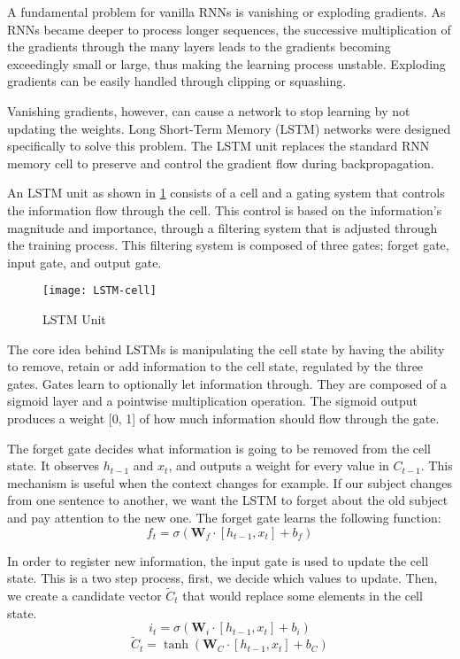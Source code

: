 A fundamental problem for vanilla RNNs is vanishing or exploding gradients. As RNNs became deeper to process longer sequences, the successive multiplication of the gradients through the many layers leads to the gradients becoming exceedingly small or large, thus making the learning process unstable. Exploding gradients can be easily handled through clipping or squashing.

Vanishing gradients, however, can cause a network to stop learning by not updating the weights. Long Short-Term Memory (LSTM) networks \citep{hochreiter1997long} were designed specifically to solve this problem. The LSTM unit replaces the standard RNN memory cell to preserve and control the gradient flow during backpropagation.

An LSTM unit as shown in \cref{fig:lstm_cell} consists of a cell and a gating system that controls the information flow through the cell. This control is based on the information's magnitude and importance, through a filtering system that is adjusted through the training process. This filtering system is composed of three gates; forget gate, input gate, and output gate.

\begin{figure}[ht]
\centering
\texttt{[image: LSTM-cell]}
\caption{LSTM Unit \protect\footnotemark}
\label{fig:lstm_cell}
\end{figure}

The core idea behind LSTMs is manipulating the cell state by having the ability to remove, retain or add information to the cell state, regulated by the three gates. Gates learn to optionally let information through. They are composed of a sigmoid layer and a pointwise multiplication operation. The sigmoid output produces a weight [0, 1] of how much information should flow through the gate.

The forget gate decides what information is going to be removed from the cell state. It observes $h_{t-1}$ and $x_t$, and outputs a weight for every value in $C_{t-1}$. This mechanism is useful when the context changes for example. If our subject changes from one sentence to another, we want the LSTM to forget about the old subject and pay attention to the new one. The forget gate learns the following function:
\[ f_t = \sigma (\mathbf{W}_f \cdot [h_{t-1}, x_t] + b_f) \]

In order to register new information, the input gate is used to update the cell state. This is a two step process, first, we decide which values to update. Then, we create a candidate vector $\tilde{C}_t$ that would replace some elements in the cell state.
\[ i_t = \sigma(\mathbf{W}_i \cdot [h_{t-1}, x_t] + b_i) \]
\[ \tilde{C}_t = \tanh ( \mathbf{W}_C \cdot [h_{t-1}, x_t] + b_C ) \]

